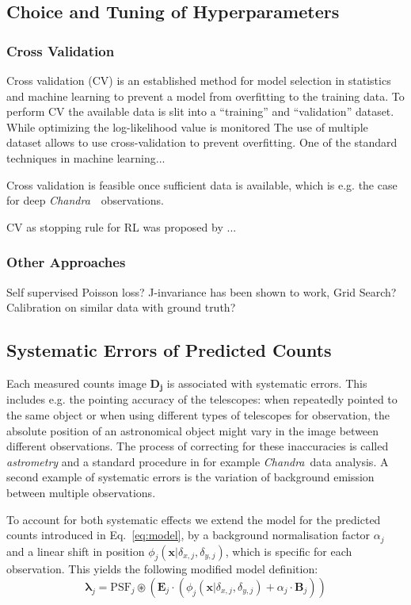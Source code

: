 \documentclass[twocolumn]{aastex631}
\newcommand{\chandra}{\textit{Chandra}~}
\begin{document}
    \subsection{Choice and Tuning of Hyperparameters}
    \subsubsection{Cross Validation}
    Cross validation (CV) is an established method for model selection in statistics and machine learning to prevent a model from overfitting to the training data. To perform CV the available data is slit into a \enquote{training} and \enquote{validation} dataset. While optimizing the log-likelihood value is monitored  The use of multiple dataset allows to use cross-validation to prevent overfitting. One of the standard techniques in machine learning...

    Cross validation is feasible once sufficient data is available, which is e.g. the 
    case for deep \chandra~observations.

    CV as stopping rule for RL was proposed by \cite{Reeves1995}...

    \subsubsection{Other Approaches}

    Self supervised Poisson loss? J-invariance has been shown to work, Grid Search? Calibration on similar data with ground truth?
    

    \subsection{Systematic Errors of Predicted Counts}
    Each measured counts image $\mathbf{D_j}$ is associated with systematic errors. This includes e.g. the pointing accuracy of the telescopes: when repeatedly pointed to the same object or when using different types of telescopes for observation, the absolute position of an astronomical object might vary in the image between different observations. The process of correcting for these inaccuracies is called \textit{astrometry} and a standard procedure in for example \chandra data analysis. A second example of systematic errors is the variation of background emission between multiple observations.
    
    To account for both systematic effects we extend the model for the predicted counts introduced in Eq.~\ref{eq:model}, by a background normalisation factor $\alpha_j$ and a linear shift in position $\phi_j(\mathbf{x}| \delta_{x,j}, \delta_{y,j})$, which is specific for each observation. This yields the following modified model definition:
    \begin{equation}
        \label{eq:model-npred-calibration}
        \mathbf{\lambda}_j = \mathrm{PSF}_j \circledast \left(\mathbf{E}_j \cdot (\phi_j(\mathbf{x}| \delta_{x,j}, \delta_{y,j}) + \alpha_j \cdot \mathbf{B}_j) \right)
    \end{equation}
    
\end{document}
